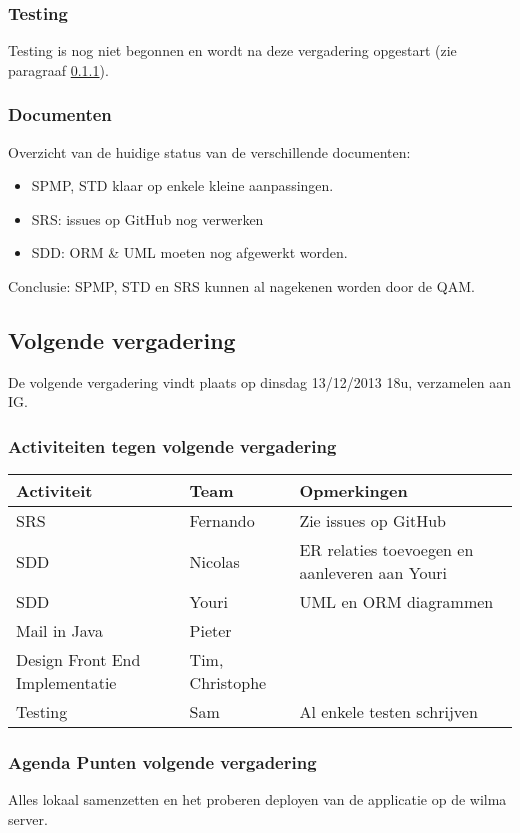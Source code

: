 \subsubsection{Testing}
Testing is nog niet begonnen en wordt na deze vergadering opgestart (zie paragraaf \ref{sec:TODOActiviteiten}).

\subsubsection{Documenten}
Overzicht van de huidige status van de verschillende documenten:
\begin{itemize}
	\item SPMP, STD klaar op enkele kleine aanpassingen.
	\item SRS: issues op GitHub nog verwerken
	\item SDD: ORM \& UML moeten nog afgewerkt worden.
\end{itemize}
Conclusie: SPMP, STD en SRS kunnen al nagekenen worden door de QAM.

\subsection{Volgende vergadering}
De volgende vergadering vindt plaats op dinsdag 13/12/2013 18u, verzamelen aan IG.
\subsubsection{Activiteiten tegen volgende vergadering} \label{sec:TODOActiviteiten}
\begin{table} [H]
	\centering
	\begin{tabular} {l|l|l}
		\textbf{Activiteit} & \textbf{Team} & \textbf{Opmerkingen} \\
		\hline
		SRS & Fernando & Zie issues op GitHub \\
		SDD & Nicolas & ER relaties toevoegen en aanleveren aan Youri \\
		SDD & Youri & UML en ORM diagrammen \\
		Mail in Java & Pieter & \\
		Design Front End Implementatie & Tim, Christophe & \\
		Testing & Sam & Al enkele testen schrijven \\
	\end{tabular}
\end{table}

\subsubsection{Agenda Punten volgende vergadering}
Alles lokaal samenzetten en het proberen deployen van de applicatie op de wilma server. 
